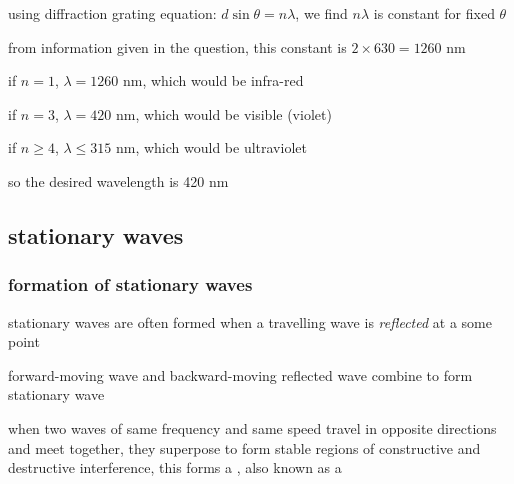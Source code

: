 
\sol using diffraction grating equation: $d \sin\theta = n\lambda$, we find $n\lambda$ is constant for fixed $\theta$

from information given in the question, this constant is $ 2\times630 = 1260 \text{ nm}$

if $n=1$, $\lambda = 1260 \text{ nm}$, which would be infra-red

if $n=3$, $\lambda = 420 \text{ nm}$, which would be visible (violet)

if $n\geq 4$, $\lambda \leq 315 \text{ nm}$, which would be ultraviolet

so the desired wavelength is 420 nm \eoe



\newpage

\subsection{stationary waves}

\subsubsection{formation of stationary waves}

stationary waves are often formed when a travelling wave is \emph{reflected} at a some point

forward-moving wave and backward-moving reflected wave combine to form stationary wave

\begin{ilight}
	when two waves of same frequency and same speed travel in opposite directions and meet together, they superpose to form stable regions of constructive and destructive interference, this forms a , also known as a 
\end{ilight}


